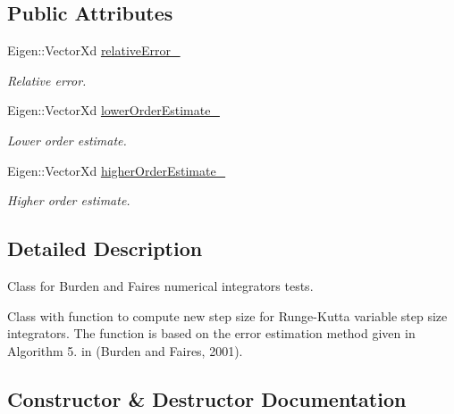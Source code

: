 \subsection*{Public Attributes}
\begin{DoxyCompactItemize}
\item 
Eigen\+::\+Vector\+Xd \hyperlink{classtudat_1_1unit__tests_1_1BurdenAndFairesNumericalIntegratorTest_ad4421029c5b1ac5077f1365af4552135}{relative\+Error\+\_\+}
\begin{DoxyCompactList}\small\item\em Relative error. \end{DoxyCompactList}\item 
Eigen\+::\+Vector\+Xd \hyperlink{classtudat_1_1unit__tests_1_1BurdenAndFairesNumericalIntegratorTest_abef947500fcc216338b8232322e1870f}{lower\+Order\+Estimate\+\_\+}
\begin{DoxyCompactList}\small\item\em Lower order estimate. \end{DoxyCompactList}\item 
Eigen\+::\+Vector\+Xd \hyperlink{classtudat_1_1unit__tests_1_1BurdenAndFairesNumericalIntegratorTest_a1971ea7cf0958eb3200b35644516e2bf}{higher\+Order\+Estimate\+\_\+}
\begin{DoxyCompactList}\small\item\em Higher order estimate. \end{DoxyCompactList}\end{DoxyCompactItemize}


\subsection{Detailed Description}
Class for Burden and Faires numerical integrators tests. 

Class with function to compute new step size for Runge-\/\+Kutta variable step size integrators. The function is based on the error estimation method given in Algorithm 5. in (Burden and Faires, 2001). 

\subsection{Constructor \& Destructor Documentation}
